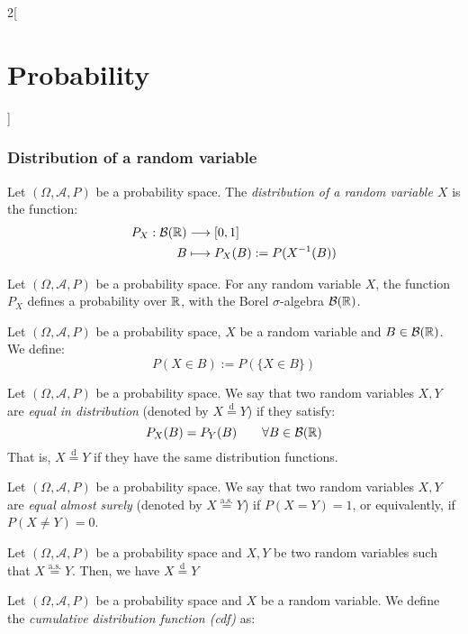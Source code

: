 \documentclass[../../../main.tex]{subfiles}
\begin{document}
\begin{multicols}{2}[\section{Probability}]
  \subsubsection{Distribution of a random variable}
  \begin{definition}
    Let $(\Omega,\mathcal{A},P)$ be a probability space. The \textit{distribution of a random variable $X$} is the function:
    \begin{align*}
      P_X:\mathcal{B}(\mathbb{R}) & \longrightarrow [0,1]            \\
      B                    & \longmapsto P_X(B):=P(X^{-1}(B))
    \end{align*}
  \end{definition}
  \begin{prop}
    Let $(\Omega,\mathcal{A},P)$ be a probability space. For any random variable $X$, the function $P_X$ defines a probability over $\mathbb{R}$, with the Borel $\sigma$-algebra $\mathcal{B}(\mathbb{R})$.
  \end{prop}
  \begin{definition}
    Let $(\Omega,\mathcal{A},P)$ be a probability space, $X$ be a random variable and $B\in\mathcal{B}(\mathbb{R})$. We define: $$P(X\in B):=P(\{X\in B\})$$
  \end{definition}
  \begin{definition}
    Let $(\Omega,\mathcal{A},P)$ be a probability space. We say that two random variables $X,Y$ are \textit{equal in distribution} (denoted by $X\overset{\text{d}}{=}Y$) if they satisfy: $$P_X(B)=P_Y(B)\qquad\forall B\in\mathcal{B}(\mathbb{R})$$ That is, $X\overset{\text{d}}{=}Y$ if they have the same distribution functions.
  \end{definition}
  \begin{definition}
    Let $(\Omega,\mathcal{A},P)$ be a probability space. We say that two random variables $X,Y$ are \textit{equal almost surely} (denoted by $X\overset{\text{a.s.}}{=}Y$) if $P(X=Y)=1$, or equivalently, if $P(X\ne Y)=0$.
  \end{definition}
  \begin{prop}
    Let $(\Omega,\mathcal{A},P)$ be a probability space and $X,Y$ be two random variables such that $X\overset{\text{a.s.}}{=}Y$. Then, we have $X\overset{\text{d}}{=}Y$
  \end{prop}
  \begin{definition}
    Let $(\Omega,\mathcal{A},P)$ be a probability space and $X$ be a random variable. We define the \textit{cumulative distribution function (cdf)} as: \begin{align*}

\end{align*}
\end{definition}
\end{multicols}
\end{document}
